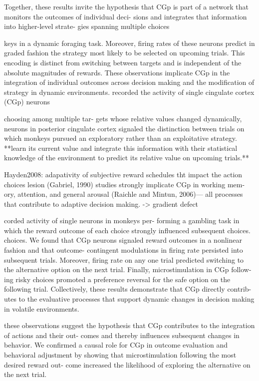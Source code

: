 \documentclass{article} %
\begin{document}
 Together, these results invite the hypothesis that CGp is part of a network that monitors the outcomes of individual deci- sions and integrates that information into higher-level strate- gies spanning multiple choices

keys in a dynamic foraging task. Moreover, firing rates of these neurons predict in graded fashion the strategy most likely to be selected on upcoming trials. This encoding is distinct from switching between targets and is independent of the absolute magnitudes of rewards. These observations implicate CGp in the integration of individual outcomes across decision making and the modification of strategy in dynamic environments.
recorded the activity of single cingulate cortex (CGp) neurons

choosing among multiple tar-
gets whose relative values changed dynamically,
neurons in posterior cingulate cortex signaled the distinction between trials on which monkeys pursued an exploratory rather than an exploitative strategy.
**learn its current value and integrate this information with their statistical knowledge of the environment to predict its relative value on upcoming trials.**



Hayden2008: adapativity of subjective reward schedules tht impact the action choices
 lesion (Gabriel, 1990) studies strongly implicate CGp in working mem- ory, attention, and general arousal (Raichle and Mintun, 2006)— all processes that contribute to adaptive decision making. -> gradient defect


corded activity of single neurons in monkeys per- forming a gambling task in which the reward outcome of each choice strongly influenced subsequent choices.
choices. We found that CGp neurons signaled reward outcomes in a nonlinear fashion and that outcome- contingent modulations in firing rate persisted into subsequent trials. Moreover, firing rate on any one trial predicted switching to the alternative option on the next trial. Finally, microstimulation in CGp follow- ing risky choices promoted a preference reversal for the safe option on the following trial. Collectively, these results demonstrate that CGp directly contrib- utes to the evaluative processes that support dynamic changes in decision making in volatile environments.

 these observations suggest the hypothesis that CGp contributes to the integration of actions and their out- comes and thereby influences subsequent changes in behavior.
 We confirmed a causal role for CGp in outcome evaluation and behavioral adjustment by showing that microstimulation following the most desired reward out- come increased the likelihood of exploring the alternative on the next trial. 
\end{document}
